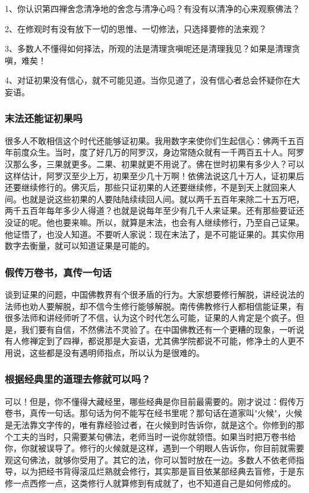 \documentclass{book}
\begin{document}
1、你认识第四禅舍念清净地的舍念与清净心吗？有没有以清净的心来观察佛法？

2、在修观时有没有放下一切的思惟、一切修法，只选择要修的法来观？

3、多数人不懂得如何择法，所观的法是清理贪嗔呢还是清理我见？如果是清理贪嗔，难矣！

4、对证初果没有信心，就不可能见道。当你见道了，没有信心者总会怀疑你在大妄语。

\subsubsection{末法还能证初果吗}

很多人不敢相信这个时代还能够证初果。我用数字来使你们生起信心：佛两千五百年前度众生。当时，度了好几万的阿罗汉，身边常随众就有一千两百五十人。阿罗汉那么多，三果就更多。二果、初果就更不用说了。佛在世时初果有多少人？可以这样估计，阿罗汉至少上万，初果至少几十万啊！依佛法说这几十万人，证初果后还要继续修行的。佛灭后，那些只证初果的人还要继续修，不是到天上就回来人间。也就是说这些初果的人要陆陆续续回人间。就以两千五百年来除二十五万吧，两千五百年每年多少人得道？也就是说每年至少有几千人来证果。还有那些要证还没证的呢。他也要来嘛。所以，就算是末法，也会有人继续修行，乃至自己证果。他证悟了，也没人知道。不要听人家说：现在末法了，是不可能证果的。其实你用数字去衡量，就可以知道证果是可能的。

\subsubsection{假传万卷书，真传一句话}

谈到证果的问题，中国佛教界有个很矛盾的行为。大家想要修行解脱，讲经说法的法师也劝人要解脱，却不信今生修行能够解脱。南传佛教修行人都相信能证果，有很多法师和讲经师听了不信，认为这个时代怎么可能，证果的人肯定是个疯子。但是，我们要有自信，不然佛法不灵验了。在中国佛教还有一个更糟的现象，一听说有人修禅定到了四禅，都说那是大妄语，尤其佛学院都说不可能，修净土的人更不用说，这些都是没有遇明师指点，所以认为是很难的。

\subsubsection{根据经典里的道理去修就可以吗？}

可以！但是，你不懂得大藏经里，哪些经典是你目前最需要的。刚才说过：假传万卷书，真传一句话。那句话为何不能写在经书里呢？那句话在道家叫"火候"，火候是无法靠文字传的，唯有靠经验过者，在火候到时告诉你，就是这个。你修到的那个工夫的当时，只需要某句佛法，老师当时一说你就领悟。如果当时把万卷书给你，你就被误导了。修行的火候就是这样，遇到一个明眼人告诉你，你目前就需要观这句佛法，就够你受用了。其它的法，你可以暂时放在一边。多数人不依老师指导，以为把经书背得滚瓜烂熟就会修行，其实那是盲目依某部经典去盲修，于是东修一点西修一点，这类修行人就算修到有成就了，也不知道自己是如何修成的。
\end{document}
